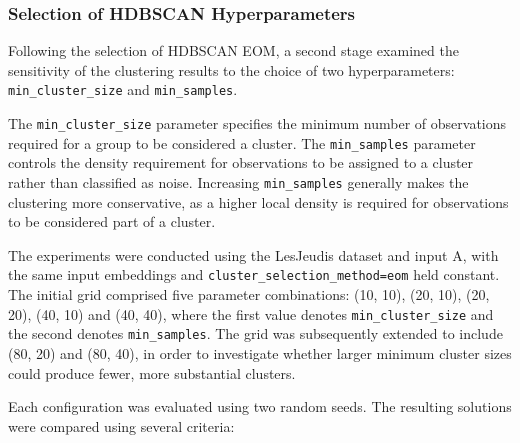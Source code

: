 \documentclass[
  letterpaper,
  DIV=11,
  numbers=noendperiod,
  sfdefaults=false]{scrartcl}
\begin{document}
\subsubsection{Selection of HDBSCAN
Hyperparameters}\label{selection-of-hdbscan-hyperparameters}

Following the selection of HDBSCAN EOM, a second stage examined the
sensitivity of the clustering results to the choice of two
hyperparameters: \texttt{min\_cluster\_size} and \texttt{min\_samples}.

The \texttt{min\_cluster\_size} parameter specifies the minimum number
of observations required for a group to be considered a cluster. The
\texttt{min\_samples} parameter controls the density requirement for
observations to be assigned to a cluster rather than classified as
noise. Increasing \texttt{min\_samples} generally makes the clustering
more conservative, as a higher local density is required for
observations to be considered part of a cluster.

The experiments were conducted using the LesJeudis dataset and input A,
with the same input embeddings and
\texttt{cluster\_selection\_method=\textquotesingle{}eom\textquotesingle{}}
held constant. The initial grid comprised five parameter combinations:
(10, 10), (20, 10), (20, 20), (40, 10) and (40, 40), where the first
value denotes \texttt{min\_cluster\_size} and the second denotes
\texttt{min\_samples}. The grid was subsequently extended to include
(80, 20) and (80, 40), in order to investigate whether larger minimum
cluster sizes could produce fewer, more substantial clusters.

Each configuration was evaluated using two random seeds. The resulting
solutions were compared using several criteria:
\end{document}
